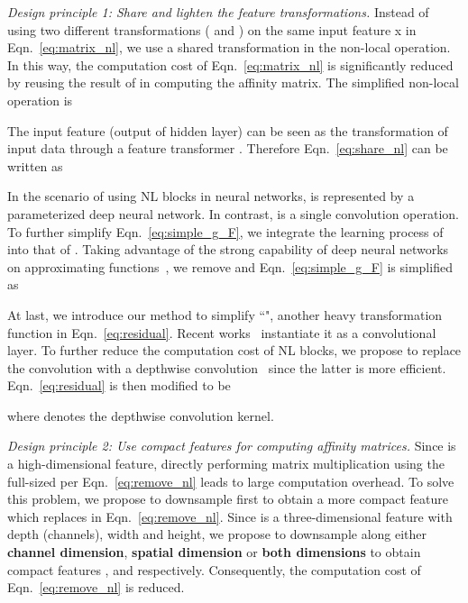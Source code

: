 \documentclass[10pt,twocolumn,letterpaper]{article}
\begin{document}
\vspace{0.5ex}\noindent\textit{Design principle 1: Share and lighten the feature transformations.}
Instead of using two different transformations ( and ) on the same input feature x in Eqn.~\eqref{eq:matrix_nl}, we use a shared transformation in the non-local operation. In this way, the computation cost of Eqn.~\eqref{eq:matrix_nl} is significantly reduced by reusing the result of  in computing the affinity matrix. The simplified non-local operation is 


The input feature  (output of hidden layer) can be seen as the transformation of input data  through a feature transformer . Therefore Eqn.~\eqref{eq:share_nl} can be written as

In the scenario of using NL blocks in neural networks,  is represented by a parameterized deep neural network. In contrast,  is a single convolution operation. To further simplify Eqn.~\eqref{eq:simple_g_F}, we integrate the learning process of  into that of . Taking advantage of the strong capability of deep neural networks on approximating functions~\cite{hornik1989multilayer}, we remove  and Eqn.~\eqref{eq:simple_g_F} is simplified as


At last, we introduce our method to simplify ``", another heavy
transformation function in Eqn.~\eqref{eq:residual}. 
Recent works~\cite{wang2018non} instantiate it as a  convolutional layer. To further reduce the computation cost of NL blocks, we propose to replace the  convolution with a  depthwise convolution~\cite{howard2017mobilenets} since the latter is more efficient. Eqn.~\eqref{eq:residual} is then modified to be

where  denotes the depthwise convolution kernel. 

\vspace{0.5ex}\noindent\textit{Design principle 2: Use compact features for computing affinity matrices.}
Since  is a high-dimensional feature, directly performing matrix multiplication using the full-sized  per Eqn.~\eqref{eq:remove_nl} leads to large computation overhead. To solve this problem, we propose to downsample  first to obtain a more compact feature which replaces  in Eqn.~\eqref{eq:remove_nl}. Since  is a three-dimensional feature with depth  (channels), width and height, 
we propose to downsample  along either \textbf{channel dimension}, \textbf{spatial dimension} or \textbf{both dimensions} to obtain compact features ,  and  respectively. Consequently, the computation cost of Eqn.~\eqref{eq:remove_nl} is reduced.
\end{document}

